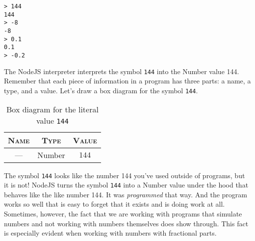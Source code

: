 
\suppresslinenumbers
\begin{lstlisting}
> 144
144
> -8
-8
> 0.1
0.1
> -0.2
\end{lstlisting}
\reactivatelinenumbers

The NodeJS interpreter interprets the symbol \texttt{144} into the \textsf{Number} value 144. Remember that each piece of information in a program has three parts: a name, a type, and a value. Let's draw a box diagram for the symbol \texttt{144}.

\begin{table}[h!]
  \begin{tabular}{|c|c|c|}
    \hline
    \textsc{Name} & \textsc{Type} & \textsc{Value}\\
    \hline
    --- & \textsf{Number} & $144$\\
    \hline
  \end{tabular}
  \caption{Box diagram for the literal value \texttt{144}}
\end{table}

The symbol \texttt{144} looks like the number 144 you've used outside of programs, but it is not! NodeJS turns the symbol \texttt{144} into a \textsf{Number} value under the hood that behaves like the like number 144. It was \emph{programmed} that way. And the program works so well that is easy to forget that it exists and is doing work at all. Sometimes, however, the fact that we are working with programs that simulate numbers and not working with numbers themselves does show through. This fact is especially evident when working with numbers with fractional parts.

